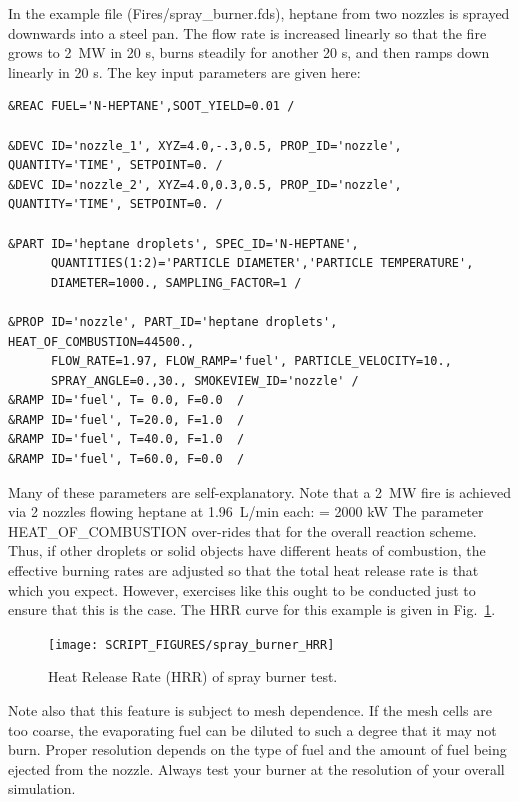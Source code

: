 \documentclass[11pt]{book}
\begin{document}
In the example file ({\ct Fires/spray\_burner.fds}), heptane from two nozzles is sprayed downwards into a steel pan.  The flow rate is increased linearly so that the fire grows to 2~MW in 20 s, burns steadily for another 20 s, and then ramps down linearly in 20 s. The key input parameters are given here:
\begin{lstlisting}
&REAC FUEL='N-HEPTANE',SOOT_YIELD=0.01 /

&DEVC ID='nozzle_1', XYZ=4.0,-.3,0.5, PROP_ID='nozzle', QUANTITY='TIME', SETPOINT=0. /
&DEVC ID='nozzle_2', XYZ=4.0,0.3,0.5, PROP_ID='nozzle', QUANTITY='TIME', SETPOINT=0. /

&PART ID='heptane droplets', SPEC_ID='N-HEPTANE',
      QUANTITIES(1:2)='PARTICLE DIAMETER','PARTICLE TEMPERATURE',
      DIAMETER=1000., SAMPLING_FACTOR=1 /

&PROP ID='nozzle', PART_ID='heptane droplets',  HEAT_OF_COMBUSTION=44500.,
      FLOW_RATE=1.97, FLOW_RAMP='fuel', PARTICLE_VELOCITY=10.,
      SPRAY_ANGLE=0.,30., SMOKEVIEW_ID='nozzle' /
&RAMP ID='fuel', T= 0.0, F=0.0  /
&RAMP ID='fuel', T=20.0, F=1.0  /
&RAMP ID='fuel', T=40.0, F=1.0  /
&RAMP ID='fuel', T=60.0, F=0.0  /
\end{lstlisting}
Many of these parameters are self-explanatory. Note that a 2~MW fire is achieved via 2 nozzles flowing heptane at 1.96~L/min each:
  \;  \times {} \;   \;
    \times {} \;   \;
    = 2000 \; \hbox{kW}
\ee
The parameter {\ct HEAT\_OF\_COMBUSTION} over-rides that for the overall reaction scheme. Thus, if other droplets or solid objects have different heats of combustion, the effective burning rates are adjusted so that the total heat release rate is that which you expect. However, exercises like this ought to be conducted just to ensure that this is the case. The HRR curve for this example is given in Fig.~\ref{spray_burner_fig}.

\begin{figure}[ht]
\begin{center}
\texttt{[image: SCRIPT\_FIGURES/spray\_burner\_HRR]}
\end{center}
\caption[Results of the {\ct spray\_burner} test case]{Heat Release Rate (HRR) of spray burner test.}
\label{spray_burner_fig}
\end{figure}

Note also that this feature is subject to mesh dependence. If the mesh cells are too coarse, the evaporating fuel can be diluted to such a degree that it may not burn. Proper resolution depends on the type of fuel and the amount of fuel being ejected from the nozzle. Always test your burner at the resolution of your overall simulation.
\end{document}
